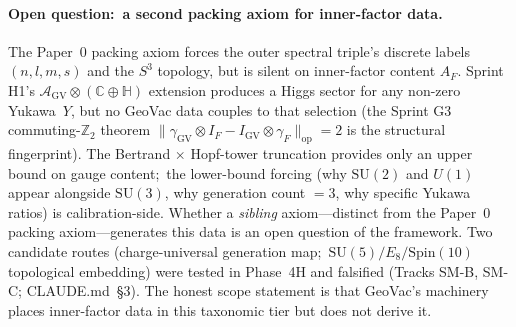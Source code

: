 \documentclass[aps,pra,twocolumn,superscriptaddress,longbibliography]{revtex4-2}
\begin{document}
\paragraph{Open question:\ a second packing axiom for inner-factor data.}
The Paper~0 packing axiom forces the outer spectral triple's
discrete labels $(n, l, m, s)$ and the $S^3$ topology, but is silent
on inner-factor content $A_F$.  Sprint H1's $\mathcal{A}_{\mathrm{GV}}
\otimes (\mathbb{C} \oplus \mathbb{H})$ extension produces a Higgs
sector for any non-zero Yukawa~$Y$, but no GeoVac data couples to
that selection (the Sprint G3 commuting-$\mathbb{Z}_2$ theorem
$\| \gamma_{\mathrm{GV}} \otimes I_F - I_{\mathrm{GV}} \otimes
\gamma_F \|_{\mathrm{op}} = 2$ is the structural fingerprint).
The Bertrand $\times$ Hopf-tower truncation provides only an upper
bound on gauge content;\ the lower-bound forcing (why $\mathrm{SU}(2)$
and $U(1)$ appear alongside $\mathrm{SU}(3)$, why generation count $= 3$,
why specific Yukawa ratios) is calibration-side.  Whether a
\emph{sibling} axiom---distinct from the Paper~0 packing axiom---generates
this data is an open question of the framework.  Two candidate routes
(charge-universal generation map;\ $\mathrm{SU}(5) / E_8 / \mathrm{Spin}(10)$
topological embedding) were tested in Phase~4H and falsified
(Tracks SM-B, SM-C; CLAUDE.md~\S 3).  The honest scope statement is
that GeoVac's machinery places inner-factor data in this taxonomic
tier but does not derive it.
\end{document}
